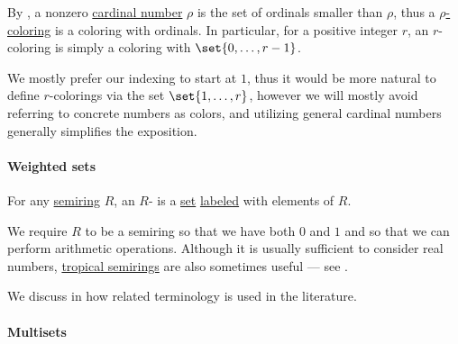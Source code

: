 \begin{remark}\label{rem:cardinal_colorings}
  By , a nonzero \hyperref[def:cardinal]{cardinal number} \( \rho \) is the set of ordinals smaller than \( \rho \), thus a \hyperref[def:set_coloring]{\( \rho \)-coloring} is a coloring with ordinals. In particular, for a positive integer \( r \), an \( r \)-coloring is simply a coloring with \( \set{ 0, \ldots, r - 1 } \).

  We mostly prefer our indexing to start at \( 1 \), thus it would be more natural to define \( r \)-colorings via the set \( \set{ 1, \ldots, r } \), however we will mostly avoid referring to concrete numbers as colors, and utilizing general cardinal numbers generally simplifies the exposition.
\end{remark}

\paragraph{Weighted sets}

\begin{definition}\label{def:weighted_set}\mimprovised
  For any \hyperref[def:semiring]{semiring} \( R \), an \( R \)- is a \hyperref[def:set]{set} \hyperref[def:labeled_set]{labeled} with elements of \( R \).
\end{definition}
\begin{comments}
  \item We require \( R \) to be a semiring so that we have both \( 0 \) and \( 1 \) and so that we can perform arithmetic operations. Although it is usually sufficient to consider real numbers, \hyperref[def:tropical_semiring]{tropical semirings} are also sometimes useful --- see .

  \item We discuss in  how related terminology is used in the literature.
\end{comments}

\paragraph{Multisets}


